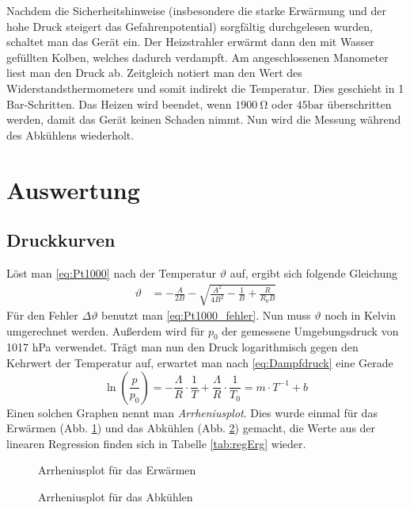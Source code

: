 \documentclass[12pt,a4paper,titlepage,headinclude,bibtotoc]{scrartcl}
\begin{document}
Nachdem die Sicherheitshinweise (insbesondere die starke Erwärmung und der hohe Druck steigert das Gefahrenpotential) sorgfältig durchgelesen wurden, schaltet man das Gerät ein.
Der Heizstrahler erwärmt dann den mit Wasser gefüllten Kolben, welches dadurch verdampft.
Am angeschlossenen Manometer liest man den Druck ab.
Zeitgleich notiert man den Wert des Widerstandsthermometers und somit indirekt die Temperatur.
Dies geschieht in 1 Bar-Schritten.
Das Heizen wird beendet, wenn $1900 ~\si{\ohm}$ oder $45 \si{\bar}$ überschritten werden, damit das Gerät keinen Schaden nimmt.
Nun wird die Messung während des Abkühlens wiederholt.

\section{Auswertung}
\label{sec:auswertung}
\subsection{Druckkurven}
Löst man \eqref{eq:Pt1000} nach der Temperatur $\vartheta$ auf, ergibt sich folgende Gleichung
\begin{align}
	\vartheta&=-\frac{A}{2B}-\sqrt{\frac{A^2}{4B^2}-\frac{1}{B}+\frac{R}{R_0 B}}
\end{align}
Für den Fehler $\Delta\vartheta$ benutzt man \eqref{eq:Pt1000_fehler}.
Nun muss $\vartheta$ noch in Kelvin umgerechnet werden.
Außerdem wird für $p_0$ der gemessene Umgebungsdruck von 1017 hPa verwendet.
Trägt man nun den Druck logarithmisch gegen den Kehrwert der Temperatur auf, erwartet man nach \eqref{eq:Dampfdruck} eine Gerade $$\ln\left(\frac{p}{p_0}\right) = -\frac{\Lambda}{R}\cdot\frac{1}{T}+\frac{\Lambda}{R}\cdot \frac{1}{T_0} = m \cdot T^{-1} + b$$
Einen solchen Graphen nennt man \textit{Arrheniusplot}.
Dies wurde einmal für das Erwärmen (Abb. \ref{fig:mess1}) und das Abkühlen (Abb. \ref{fig:mess2}) gemacht, die Werte aus der linearen Regression finden sich in Tabelle \ref{tab:regErg} wieder.

\begin{figure}[!htb]
	\centering
	
	\caption{Arrheniusplot für das Erwärmen}
	\label{fig:mess1}
\end{figure}

\begin{figure}[!htb]
	\centering
	
	\caption{Arrheniusplot für das Abkühlen}
	\label{fig:mess2}
\end{figure}
\end{document}
